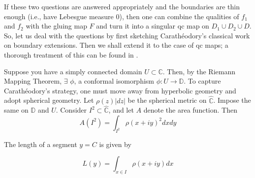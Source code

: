 \documentclass[11pt,a4paper]{article}
\begin{document}


        \begin{figure}[ht!]
        \end{figure}

        If these two questions are answered appropriately and the boundaries are thin enough (i.e., have Lebesgue measure $0$), then one can combine the qualities of $f_1$ and $f_2$ with the gluing map $F$ and turn it into a singular qc map on $D_1 \cup D_2 \cup D$. So, let us deal with the questions by first sketching Carath\'eodory's classical work on boundary extensions. Then we shall extend it to the case of qc maps; a thorough treatment of this can be found in \cite{pommerenke2013boundary}.

        Suppose you have a simply connected domain $U \subset \mathbb{C}$. Then, by the Riemann Mapping Theorem, $\exists$ $\phi$, a conformal isomorphism $\phi: U \rightarrow \mathbb{D}$. To capture Carath\'eodory's strategy, one must move away from hyperbolic geometry and adopt spherical geometry. Let $\rho(z)|dz|$ be the spherical metric on $\hat{\mathbb{C}}$. Impose the same on $\mathbb{D}$ and $U$. Consider $I^2 \subset \hat{\mathbb{C}}$, and let $A$ denote the area function. Then
        $$A(I^2) = \int_{I^2}{\rho(x+iy)^2dxdy}$$

        The length of a segment $y = C$ is given by

        $$L(y) = \int_{x\in I}{\rho(x+iy)dx}$$

\end{document}
